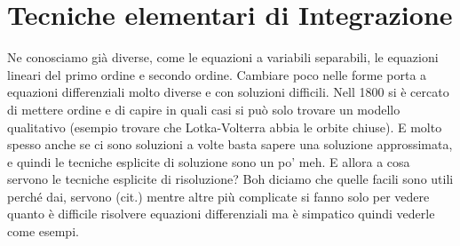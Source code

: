 \section{Tecniche elementari di Integrazione}
Ne conosciamo già diverse, come le equazioni a variabili separabili, le
equazioni lineari del primo ordine e secondo ordine. Cambiare poco nelle forme
porta a equazioni differenziali molto diverse e con soluzioni difficili.
Nell 1800 si è cercato di mettere ordine e di capire in quali casi si può solo
trovare un modello qualitativo (esempio trovare che Lotka-Volterra abbia le
orbite chiuse). E molto spesso anche se ci sono soluzioni a volte basta sapere
una soluzione approssimata, e quindi le tecniche esplicite di soluzione sono un
po' meh. E allora a cosa servono le tecniche esplicite di risoluzione? Boh
diciamo che quelle facili sono utili perché dai, servono (cit.) mentre altre più
complicate si fanno solo per vedere quanto è difficile risolvere equazioni
differenziali ma è simpatico quindi vederle come esempi.

